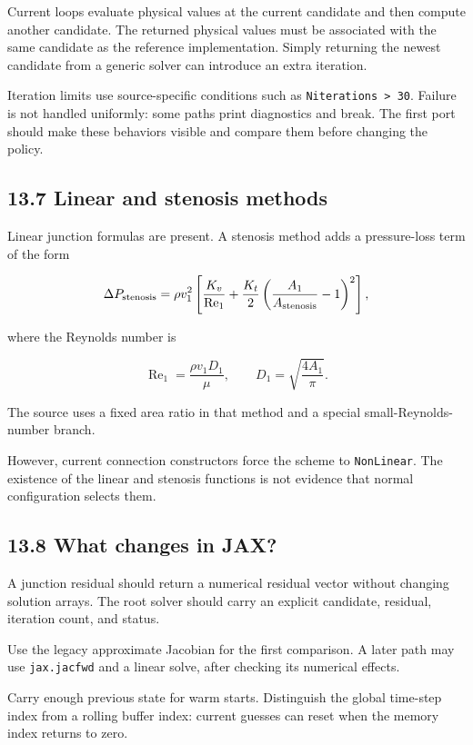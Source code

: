 \documentclass[11pt,a4paper]{article}
\begin{document}
Current loops evaluate physical values at the current candidate and then compute another candidate. The returned physical values must be associated with the same candidate as the reference implementation. Simply returning the newest candidate from a generic solver can introduce an extra iteration.

Iteration limits use source-specific conditions such as \texttt{Niterations > 30}. Failure is not handled uniformly: some paths print diagnostics and break. The first port should make these behaviors visible and compare them before changing the policy.

\subsection{13.7 Linear and stenosis methods}
Linear junction formulas are present. A stenosis method adds a pressure-loss term of the form


\begingroup\small
\[
\Delta P_{\rm stenosis}
=
\rho v_1^2
\left[
\frac{K_v}{\operatorname{Re}_1}
+\frac{K_t}{2}
\left(\frac{A_1}{A_{\rm stenosis}}-1\right)^2
\right],
\]
\endgroup


where the Reynolds number is


\begingroup\small
\[
\operatorname{Re}_1=\frac{\rho v_1D_1}{\mu},
\qquad
D_1=\sqrt{\frac{4A_1}{\pi}}.
\]
\endgroup


The source uses a fixed area ratio in that method and a special small-Reynolds-number branch.

However, current connection constructors force the scheme to \texttt{NonLinear}. The existence of the linear and stenosis functions is not evidence that normal configuration selects them.

\subsection{13.8 What changes in JAX?}
A junction residual should return a numerical residual vector without changing solution arrays. The root solver should carry an explicit candidate, residual, iteration count, and status.

Use the legacy approximate Jacobian for the first comparison. A later path may use \texttt{jax.\allowbreak{}jacfwd} and a linear solve, after checking its numerical effects.

Carry enough previous state for warm starts. Distinguish the global time-step index from a rolling buffer index: current guesses can reset when the memory index returns to zero.
\end{document}
